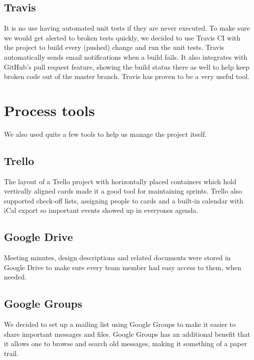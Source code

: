 \subsection{Travis}

It is no use having automated unit tests if they are never executed. To make sure we would get alerted to broken tests quickly, we decided to use Travis CI with the project to build every (pushed) change and run the unit tests. Travis automatically sends email notifications when a build fails. It also integrates with GitHub's pull request feature, showing the build status there as well to help keep broken code out of the master branch. Travis has proven to be a very useful tool.  

\section{Process tools}

We also used quite a few tools to help us manage the project itself.

\subsection{Trello}

The layout of a Trello project with horizontally placed containers which hold vertically aligned cards made it a good tool for maintaining sprints. Trello also supported check-off lists, assigning people to cards and a built-in calendar with iCal export so important events showed up in everyones agenda. 

\subsection{Google Drive}

Meeting minutes, design descriptions and related documents were stored in Google Drive to make sure every team member had easy access to them, when needed. 

\subsection{Google Groups}

We decided to set up a mailing list using Google Groups to make it easier to share important messages and files. Google Groups has an additional benefit that it allows one to browse and search old messages, making it something of a paper trail. 
